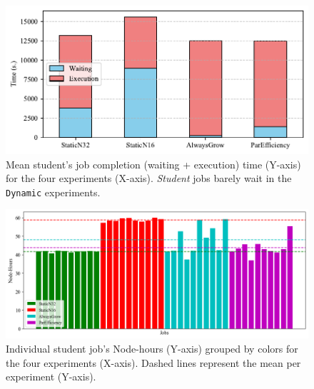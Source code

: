 \documentclass[a4paper,fleqn]{cas-dc}
\begin{document}
\begin{figure}[tbp]
    \centering
        \includegraphics[clip,width=0.75\linewidth,trim={0.1cm 0.1cm 0.1cm 0.1cm}]{figures/phd-stacked.pdf}
        \caption{Mean student's job completion (waiting + execution) time (Y-axis) for the four experiments (X-axis). \textit{Student} jobs barely wait in the \texttt{Dynamic} experiments.}
        \label{fig:phd_completion}
\end{figure}

\begin{figure}[tbp]
        \includegraphics[clip,width=\linewidth,trim={0.2cm 0.1cm 0.2cm 0.1cm}]{figures/node-hours3.png}
        \caption{Individual student job's Node-hours (Y-axis) grouped by colors for the four experiments (X-axis). Dashed lines represent the mean per experiment (Y-axis).}
        \label{fig:phd_nodehours}
\end{figure}
\end{document}
